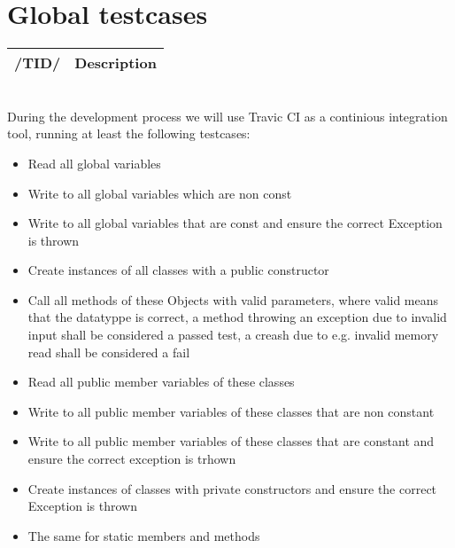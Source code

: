 \chapter{Global testcases}
\begin{tabular}{|l | l|}
   \hline
  /TID/ & Description \\
   \hline
\end{tabular} \\

During the development process we will use Travic CI as a continious integration tool, running at least the following testcases:
\begin{itemize}
	\item Read all global variables
	\item Write to all global variables which are non const
	\item Write to all global variables that are const and ensure the correct Exception is thrown
	\item Create instances of all classes with a public constructor
	\item Call all methods of these Objects with valid parameters, where valid means that the datatyppe is correct, a method throwing an exception due to invalid input shall be considered a passed test, a creash due to e.g. invalid memory read shall be considered a fail
	\item Read all public member variables of these classes
	\item Write to all public member variables of these classes that are non constant
	\item Write to all public member variables of these classes that are constant and ensure the correct exception is trhown
	\item Create instances of classes with private constructors and ensure the correct Exception is thrown
	\item The same for static members and methods
\end{itemize}